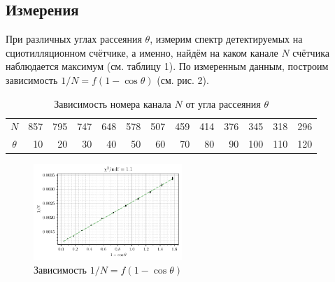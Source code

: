 \subsection*{Измерения}

При различных углах рассеяния $\theta$, измерим спектр детектируемых на сциотилляционном счётчике, а именно, найдём на каком канале $N$ счётчика наблюдается максимум (см. таблицу 1).
По измеренным данным, построим зависимость $1/N = f(1-\cos \theta)$ (см. рис. 2).

\begin{table}
    \centering
    \caption{Зависимость номера канала $N$ от угла рассеяния $\theta$}
\begin{tabular}{c|rrrrrrrrrrrr}
\hline
 $N$   &  857 &  795 &  747 &  648 &  578 &  507 &  459 &  414 &  376 &  345 &  318 &  296 \\
$\theta$ &   10 &   20 &   30 &   40 &   50 &   60 &   70 &   80 &   90 &  100 &  110 &  120 \\
\hline
\end{tabular}
\end{table}




\begin{figure}[h]
    \centering
    \includegraphics[width=0.5\textwidth]{figures/plot.pdf}
    \caption{Зависимость $1/N = f(1 - \cos \theta)$}
    \label{fig:1}
\end{figure}

